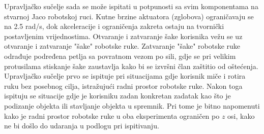 \documentclass[times, utf8, diplomski, numeric]{fer}
\begin{document}
Upravljačko sučelje sada se može ispitati u potpunosti sa svim komponentama na stvarnoj Jaco robotskoj ruci.
Kutne brzine aktuatora (zglobova) ograničavaju se na 2.5 rad/s, dok akceleracije i ograničenja zakreta ostaju na tvornički postavljenim vrijednostima.
Otvaranje i zatvaranje šake korisnika vežu se uz otvaranje i zatvaranje "šake" robotske ruke.
Zatvaranje "šake" robotske ruke odrađuje podređena petlja sa povratnom vezom po sili, gdje se pri velikim protusilama stiskanje šake zaustavlja kako bi se izvršni član zaštitio od oštećenja.
Upravljačko sučelje prvo se ispituje pri situacijama gdje korisnik miče i rotira ruku bez posebnog cilja, istražujući radni prostor robotske ruke.
Nakon toga ispituju se situacije gdje je korisniku zadan konkretan zadatak kao što je podizanje objekta ili stavljanje objekta u spremnik.
Pri tome je bitno napomenuti kako je radni prostor robotske ruke u oba eksperimenta ograničen po $z$ osi, kako ne bi došlo do udaranja u podlogu pri ispitivanju.
\end{document}
